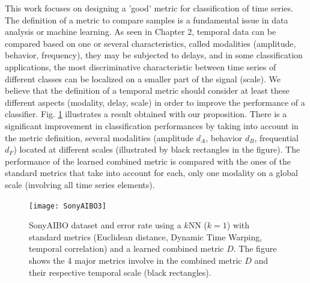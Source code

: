  This work focuses on designing a 'good' metric for classification of time series. The definition of a metric to compare samples is a fundamental issue in data analysis or machine learning. As seen in Chapter 2, temporal data can be compared based on one or several characteristics, called modalities (amplitude, behavior, frequency), they may be subjected to delays, and in some classification applications, the most discriminative characteristic between time series of different classes can be localized on a smaller part of the signal (scale). We believe that the definition of a temporal metric should consider at least these different aspects (modality, delay, scale) in order to improve the performance of a classifier. Fig. \ref{fig:SonyAIBO} illustrates a result obtained with our proposition. There is a significant improvement in classification performances by taking into account in the metric definition, several modalities (amplitude $d_A$, behavior $d_B$, frequential $d_F$) located at different scales (illustrated by black rectangles in the figure). The performance of the learned combined metric is compared with the ones of the standard metrics that take into account for each, only one modality on a global scale (involving all time series elements).  




\begin{figure}[h!]
	\centering
	\texttt{[image: SonyAIBO3]}
	\caption{SonyAIBO dataset and error rate using a $k$NN ($k=1$) with standard metrics (Euclidean distance, Dynamic Time Warping, temporal correlation) and a learned combined metric $D$. The figure shows the 4 major metrics involve in the combined metric $D$ and their respective temporal scale (black rectangles).}
	\label{fig:SonyAIBO}
\end{figure}


